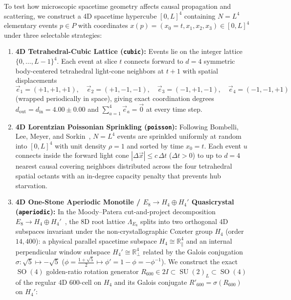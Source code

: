 \documentclass[11pt,a4paper]{article}
\theoremstyle{definition}
\theoremstyle{remark}
\newcommand{\R}{\mathbb{R}}
\newcommand{\SU}{\operatorname{SU}}
\newcommand{\SO}{\operatorname{SO}}
\begin{document}
To test how microscopic spacetime geometry affects causal propagation and scattering, we construct a 4D spacetime hypercube $[0, L]^4$ containing $N = L^4$ elementary events $p \in P$ with coordinates $x(p) = (x_0 = t, x_1, x_2, x_3) \in [0, L]^4$ under three selectable strategies:
\begin{enumerate}
    \item \textbf{4D Tetrahedral-Cubic Lattice (\texttt{cubic}):} Events lie on the integer lattice $\{0, \dots, L-1\}^4$. Each event at slice $t$ connects forward to $d = 4$ symmetric body-centered tetrahedral light-cone neighbors at $t + 1$ with spatial displacements
    \begin{equation}
    \vec{e}_1 = (+1, +1, +1), \quad \vec{e}_2 = (+1, -1, -1), \quad \vec{e}_3 = (-1, +1, -1), \quad \vec{e}_4 = (-1, -1, +1)
    \end{equation}
    (wrapped periodically in space), giving exact coordination degrees $d_{\mathrm{out}} = d_{\mathrm{in}} = 4.00 \pm 0.00$ and $\sum_{a=1}^4 \vec{e}_a = \vec{0}$ at every time step.
    \item \textbf{4D Lorentzian Poissonian Sprinkling (\texttt{poisson}):} Following Bombelli, Lee, Meyer, and Sorkin~\cite{Bombelli1987}, $N = L^4$ events are sprinkled uniformly at random into $[0, L]^4$ with unit density $\rho = 1$ and sorted by time $x_0 = t$. Each event $u$ connects inside the forward light cone $|\Delta \vec{x}| \le c\,\Delta t$ ($\Delta t > 0$) to up to $d = 4$ nearest causal covering neighbors distributed across the four tetrahedral spatial octants with an in-degree capacity penalty that prevents hub starvation.
    \item \textbf{4D One-Stone Aperiodic Monotile / $E_8 \to H_4 \oplus H_4'$ Quasicrystal (\texttt{aperiodic}):} In the Moody--Patera cut-and-project decomposition $E_8 \to H_4 \oplus H_4'$~\cite{MoodyPatera1993,Coxeter1974}, the 8D root lattice $\Lambda_{E_8}$ splits into two orthogonal 4D subspaces invariant under the non-crystallographic Coxeter group $H_4$ (order $14{,}400$): a physical parallel spacetime subspace $H_4 \cong \R^4_\parallel$ and an internal perpendicular window subspace $H_4' \cong \R^4_\perp$ related by the Galois conjugation $\sigma : \sqrt{5} \mapsto -\sqrt{5}$ ($\phi = \frac{1+\sqrt{5}}{2} \mapsto \phi' = 1 - \phi = -\phi^{-1}$). We construct the exact $\SO(4)$ golden-ratio rotation generator $R_{600} \in 2I \subset \SU(2)_L \subset \SO(4)$ of the regular 4D $600$-cell on $H_4$ and its Galois conjugate $R'_{600} = \sigma(R_{600})$ on $H_4'$:
    \begin{equation}

\end{equation}
\end{enumerate}
\end{document}
